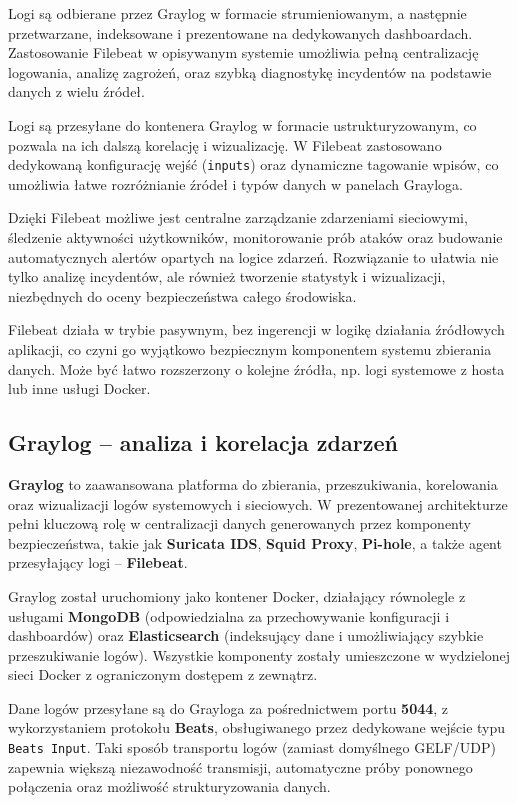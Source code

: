 \documentclass[
    left=2.5cm,         %
    right=2.5cm,        %
    top=2.5cm,          %
    bottom=3cm,         %
    bindingoffset=6mm,  %
    nohyphenation=true %
]{eiti/eiti-thesis} %
\begin{document}
Logi są odbierane przez Graylog w formacie strumieniowanym, a następnie przetwarzane, indeksowane i prezentowane na dedykowanych dashboardach. Zastosowanie Filebeat w opisywanym systemie umożliwia pełną centralizację logowania, analizę zagrożeń, oraz szybką diagnostykę incydentów na podstawie danych z wielu źródeł.



Logi są przesyłane do kontenera Graylog w formacie ustrukturyzowanym, co pozwala na ich dalszą korelację i wizualizację. W Filebeat zastosowano dedykowaną konfigurację wejść (\texttt{inputs}) oraz dynamiczne tagowanie wpisów, co umożliwia łatwe rozróżnianie źródeł i typów danych w panelach Grayloga.

Dzięki Filebeat możliwe jest centralne zarządzanie zdarzeniami sieciowymi, śledzenie aktywności użytkowników, monitorowanie prób ataków oraz budowanie automatycznych alertów opartych na logice zdarzeń. Rozwiązanie to ułatwia nie tylko analizę incydentów, ale również tworzenie statystyk i wizualizacji, niezbędnych do oceny bezpieczeństwa całego środowiska.

Filebeat działa w trybie pasywnym, bez ingerencji w logikę działania źródłowych aplikacji, co czyni go wyjątkowo bezpiecznym komponentem systemu zbierania danych. Może być łatwo rozszerzony o kolejne źródła, np. logi systemowe z hosta lub inne usługi Docker.

\subsection{Graylog – analiza i korelacja zdarzeń}

\textbf{Graylog} to zaawansowana platforma do zbierania, przeszukiwania, korelowania oraz wizualizacji logów systemowych i sieciowych. W prezentowanej architekturze pełni kluczową rolę w centralizacji danych generowanych przez komponenty bezpieczeństwa, takie jak \textbf{Suricata IDS}, \textbf{Squid Proxy}, \textbf{Pi-hole}, a także agent przesyłający logi – \textbf{Filebeat}.

Graylog został uruchomiony jako kontener Docker, działający równolegle z usługami \textbf{MongoDB} (odpowiedzialna za przechowywanie konfiguracji i dashboardów) oraz \textbf{Elasticsearch} (indeksujący dane i umożliwiający szybkie przeszukiwanie logów). Wszystkie komponenty zostały umieszczone w wydzielonej sieci Docker z ograniczonym dostępem z zewnątrz.

Dane logów przesyłane są do Grayloga za pośrednictwem portu \textbf{5044}, z wykorzystaniem protokołu \textbf{Beats}, obsługiwanego przez dedykowane wejście typu \texttt{Beats Input}. Taki sposób transportu logów (zamiast domyślnego GELF/UDP) zapewnia większą niezawodność transmisji, automatyczne próby ponownego połączenia oraz możliwość strukturyzowania danych.
\end{document}
